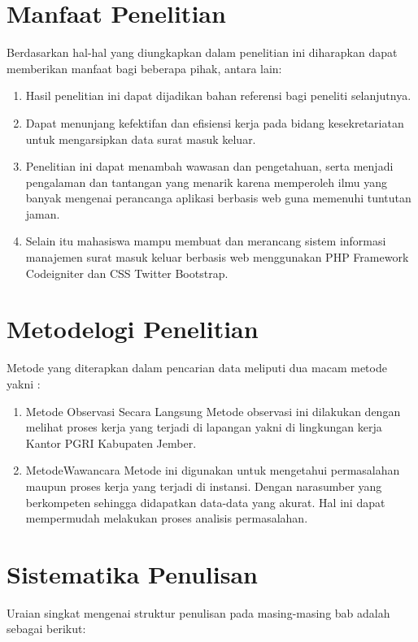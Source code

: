 \documentclass{jtetiproposalskripsi}
\begin{document}
\section{Manfaat Penelitian}
Berdasarkan hal-hal yang diungkapkan dalam penelitian ini diharapkan dapat memberikan manfaat bagi beberapa pihak, antara lain:
\begin{enumerate}
\item Hasil penelitian ini dapat dijadikan bahan referensi bagi peneliti selanjutnya.
\item Dapat menunjang kefektifan dan efisiensi kerja pada bidang kesekretariatan untuk mengarsipkan data surat masuk keluar.
\item Penelitian ini dapat menambah wawasan dan pengetahuan, serta menjadi pengalaman dan tantangan yang menarik karena memperoleh ilmu yang banyak mengenai perancanga aplikasi berbasis web guna memenuhi tuntutan jaman. 
\item Selain itu mahasiswa mampu membuat dan merancang sistem informasi manajemen surat masuk keluar berbasis web menggunakan PHP Framework Codeigniter dan CSS Twitter Bootstrap.
\end{enumerate}

\section{Metodelogi Penelitian}
Metode yang diterapkan dalam pencarian data meliputi dua macam metode yakni :
\begin{enumerate}
\item Metode Observasi Secara Langsung Metode observasi ini dilakukan dengan melihat proses kerja yang terjadi di lapangan yakni di lingkungan kerja Kantor PGRI Kabupaten Jember.
\item MetodeWawancara Metode ini digunakan untuk mengetahui permasalahan maupun proses kerja yang terjadi di instansi. Dengan narasumber yang berkompeten sehingga didapatkan data-data yang akurat. Hal ini dapat mempermudah melakukan proses analisis permasalahan.
\end{enumerate}

\section{Sistematika Penulisan}
Uraian singkat mengenai struktur penulisan pada masing-masing bab adalah sebagai berikut:
\end{document}

